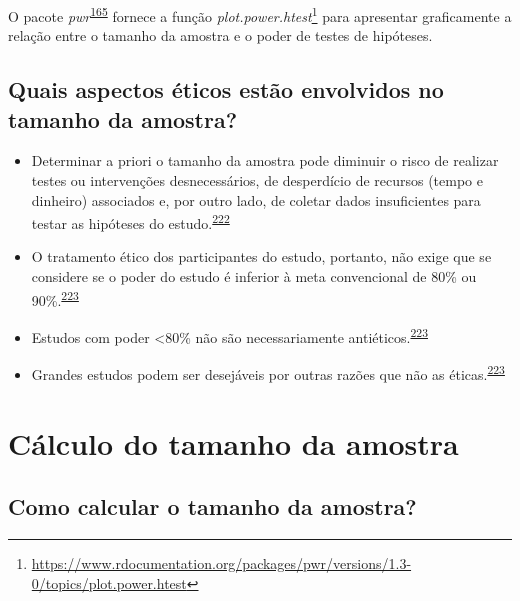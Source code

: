\documentclass[
  a4paper,
]{book}
\renewcommand{\href}[2]{#2\footnote{\url{#1}}}
\newenvironment{infobox}[1]
  {
  \begin{itemize}
  \renewcommand{\labelitemi}{
    \raisebox{-.7\height}[0pt][0pt]{
      {\setkeys{Gin}{width=3em,keepaspectratio}
        \texttt{[image: \#1]}}
    }
  }
  \setlength{\fboxsep}{1em}
  \begin{blackbox}
  \item
  }
  {
  \end{blackbox}
  \end{itemize}
  }
\begin{document}
\begin{infobox}{images/Rlogo}
O pacote \emph{pwr}\textsuperscript{\protect\hyperlink{ref-pwr}{165}} fornece a função \href{https://www.rdocumentation.org/packages/pwr/versions/1.3-0/topics/plot.power.htest}{\emph{plot.power.htest}} para apresentar graficamente a relação entre o tamanho da amostra e o poder de testes de hipóteses.

\end{infobox}

\hypertarget{quais-aspectos-uxe9ticos-estuxe3o-envolvidos-no-tamanho-da-amostra}{%
\subsection{Quais aspectos éticos estão envolvidos no tamanho da amostra?}\label{quais-aspectos-uxe9ticos-estuxe3o-envolvidos-no-tamanho-da-amostra}}

\begin{itemize}
\item
  Determinar a priori o tamanho da amostra pode diminuir o risco de realizar testes ou intervenções desnecessários, de desperdício de recursos (tempo e dinheiro) associados e, por outro lado, de coletar dados insuficientes para testar as hipóteses do estudo.\textsuperscript{\protect\hyperlink{ref-rodruxedguezdeluxe1guila2014}{222}}
\item
  O tratamento ético dos participantes do estudo, portanto, não exige que se considere se o poder do estudo é inferior à meta convencional de 80\% ou 90\%.\textsuperscript{\protect\hyperlink{ref-Bacchetti2005}{223}}
\item
  Estudos com poder \textless80\% não são necessariamente antiéticos.\textsuperscript{\protect\hyperlink{ref-Bacchetti2005}{223}}
\item
  Grandes estudos podem ser desejáveis por outras razões que não as éticas.\textsuperscript{\protect\hyperlink{ref-Bacchetti2005}{223}}
\end{itemize}

\hypertarget{cuxe1lculo-do-tamanho-da-amostra}{%
\section{Cálculo do tamanho da amostra}\label{cuxe1lculo-do-tamanho-da-amostra}}

\hypertarget{como-calcular-o-tamanho-da-amostra}{%
\subsection{Como calcular o tamanho da amostra?}\label{como-calcular-o-tamanho-da-amostra}}
\end{document}
